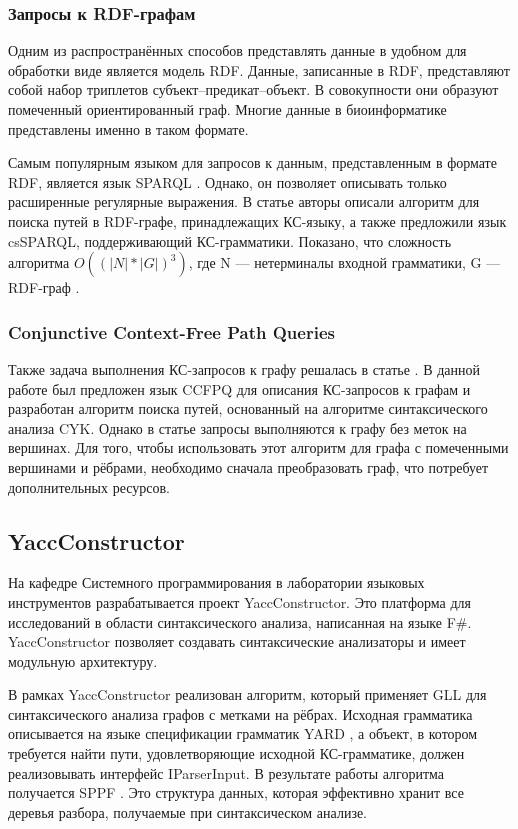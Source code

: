 \documentclass[14pt]{matmex-diploma}
\begin{document}
\subsubsection{Запросы к RDF-графам}
Одним из распространённых способов представлять данные в удобном для обработки виде является модель RDF. Данные, записанные в RDF, представляют собой набор триплетов субъект--предикат--объект. В совокупности они образуют помеченный ориентированный граф. Многие данные в биоинформатике представлены именно в таком формате.

Самым популярным языком для запросов к данным, представленным в формате RDF, является язык SPARQL \cite{prud2008sparql}. Однако, он позволяет описывать только расширенные регулярные выражения. В статье \cite{zhang2016context} авторы описали алгоритм для поиска путей в RDF-графе, принадлежащих КС-языку, а также предложили язык csSPARQL, поддерживающий КС-грамматики. Показано, что сложность алгоритма $O((|N|*|G|)^3)$, где N --- нетерминалы входной грамматики, G --- RDF-граф \cite{zhang2016context}.

\subsubsection{Conjunctive Context-Free Path Queries}
Также задача выполнения КС-запросов к графу решалась в статье \cite{hellings2014conjunctive}. В данной работе был предложен язык CCFPQ для описания КС-запросов к графам и разработан алгоритм поиска путей, основанный на алгоритме синтаксического анализа CYK. Однако в статье запросы выполняются к графу без меток на вершинах. Для того, чтобы использовать этот алгоритм для графа с помеченными вершинами и рёбрами, необходимо сначала преобразовать граф, что потребует дополнительных ресурсов.

\subsection{YaccConstructor}

На кафедре Системного программирования в лаборатории языковых инструментов разрабатывается проект YaccConstructor. Это платформа для исследований в области синтаксического анализа, написанная на языке F\#. YaccConstructor позволяет создавать синтаксические анализаторы и имеет модульную архитектуру.

В рамках YaccConstructor реализован алгоритм, который применяет GLL для синтаксического анализа графов с метками на рёбрах. Исходная грамматика описывается на языке спецификации грамматик YARD \cite{YARD}, а  объект, в котором требуется найти пути, удовлетворяющие исходной КС-грамматике, должен реализовывать интерфейс IParserInput. В результате работы алгоритма получается SPPF \cite{rekers1992parser}. Это структура данных, которая эффективно хранит все деревья разбора, получаемые при синтаксическом анализе.
\end{document}
